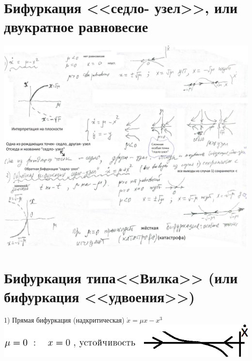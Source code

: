 \documentclass[a4paper,12pt]{article}
\theoremstyle{plain} %
\theoremstyle{definition} %
\theoremstyle{remark} %
\begin{document}
\section{{\large Бифуркация <<седло- узел>>, или двукратное равновесие}}
\includegraphics[scale=0.58]{33}
\section{{\large Бифуркация типа<<Вилка>> (или бифуркация <<удвоения>>)}}
1) Прямая бифуркация (надкритическая) \hspace{1cm} $\dot{x}={\mu}x-x^3$\\

\includegraphics[scale=0.81]{44}
\end{document}
